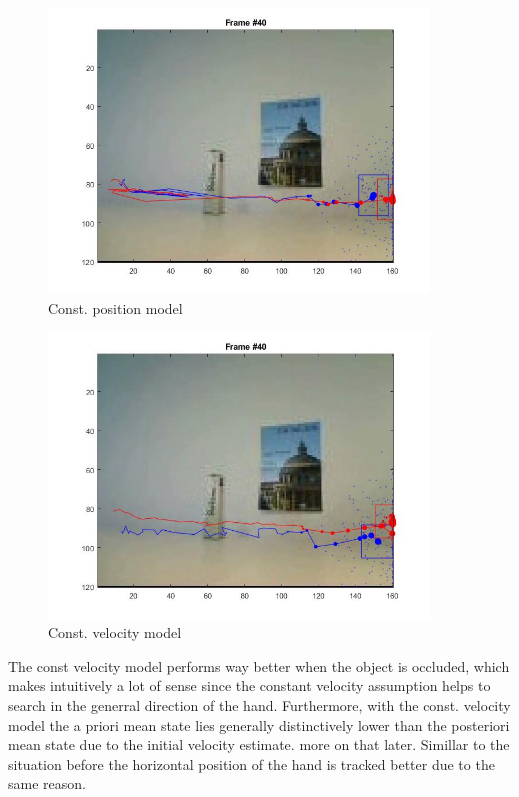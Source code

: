 \documentclass[12pt]{article}
\begin{document}
\vspace{5mm}
\begin{figure}[H]
	\centering
	\includegraphics[width=0.9\textwidth]{bad_position_model.jpg}
	\caption{Const. position model}
	\label{fig1}
\end{figure}
\vspace{5mm}
\vspace{5mm}
\begin{figure}[H]
	\centering
	\includegraphics[width=0.9\textwidth]{const_vel.jpg}
	\caption{Const. velocity model}
	\label{fig1}
\end{figure}
\vspace{5mm}

The const velocity model performs way better when the object is occluded, which makes intuitively a lot of sense since the constant velocity assumption helps to search in the generral direction of the hand. 
Furthermore, with the const. velocity model the a priori mean state lies generally distinctively lower than the posteriori mean state due to the initial velocity estimate. more on that later. Simillar to the situation before the horizontal position of the hand is tracked better due to the same reason. 
\end{document}
